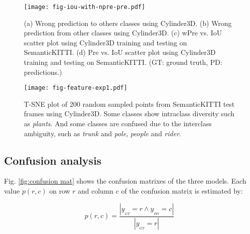 \documentclass[journal]{IEEEtran}
\begin{document}
\begin{figure*}[t]
	\centering
	\texttt{[image: fig-iou-with-npre-pre.pdf]}
	\vspace{-6mm}
	\caption{(a) Wrong prediction to others classes using Cylinder3D. (b) Wrong prediction from other classes using Cylinder3D. (c) wPre vs. IoU scatter plot using Cylinder3D training and testing on SemanticKITTI. (d) Pre vs. IoU scatter plot using Cylinder3D training and testing on SemanticKITTI. (GT: ground truth, PD: predictions.)}
	\label{fig:4-f}
	\vspace{-2mm}
\end{figure*}

\begin{figure*}[t]
	\centering
	\texttt{[image: fig-feature-exp1.pdf]}
	\vspace{-3mm}
	\caption{T-SNE plot of 200 random sampled points from SemanticKITTI test frames using Cylinder3D. Some classes show intraclass diversity such as \textit{plants}. And some classes are confused due to the interclass ambiguity, such as \textit{trunk} and \textit{pole}, \textit{people} and \textit{rider}.}
	\label{fig:feature-exp1}
	\vspace{-4mm}
\end{figure*}



\subsection{Confusion analysis}

Fig. \ref{fig:confusion mat} shows the confusion matrixes of the three models. Each value $p(r,c)$ on row $r$ and column $c$ of the confusion matrix is estimated by:

\vspace{-1mm}
\begin{equation}
p(r,c) = \frac{|y_{_{GT}}=r \land y_{_{PD}}=c|}{|y_{_{GT}}=r|}
\end{equation}
\end{document}
